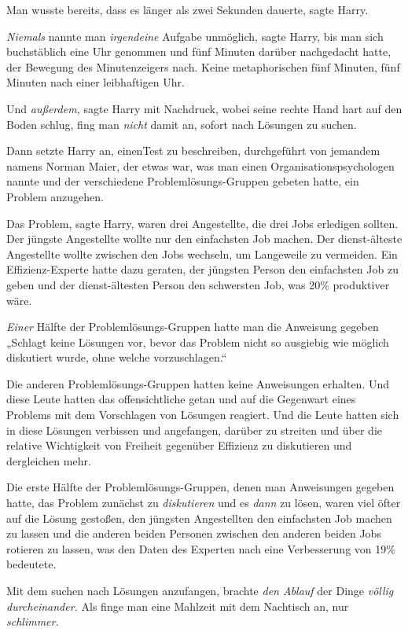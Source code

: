 {Man wusste bereits, dass es länger als zwei Sekunden dauerte, sagte Harry.

\emph{Niemals} nannte man \emph{irgendeine} Aufgabe unmöglich, sagte Harry, bis man sich buchstäblich eine Uhr genommen und fünf Minuten darüber nachgedacht hatte, der Bewegung des Minutenzeigers nach. Keine metaphorischen fünf Minuten, fünf Minuten nach einer leibhaftigen Uhr.

Und \emph{außerdem,} sagte Harry mit Nachdruck, wobei seine rechte Hand hart auf den Boden schlug, fing man \emph{nicht} damit an, sofort nach Lösungen zu suchen.

Dann setzte Harry an, einenTest zu beschreiben, durchgeführt von jemandem namens Norman Maier, der etwas war, was man einen Organisationspsychologen nannte und der verschiedene Problemlösungs-Gruppen gebeten hatte, ein Problem anzugehen.

Das Problem, sagte Harry, waren drei Angestellte, die drei Jobs erledigen sollten. Der jüngste Angestellte wollte nur den einfachsten Job machen. Der dienst-älteste Angestellte wollte zwischen den Jobs wechseln, um Langeweile zu vermeiden. Ein Effizienz-Experte hatte dazu geraten, der jüngsten Person den einfachsten Job zu geben und der dienst-ältesten Person den schwersten Job, was 20\% produktiver wäre.

\emph{Einer} Hälfte der Problemlösungs-Gruppen hatte man die Anweisung gegeben „Schlagt keine Lösungen vor, bevor das Problem nicht so ausgiebig wie möglich diskutiert wurde, ohne welche vorzuschlagen.“

Die anderen Problemlösungs-Gruppen hatten keine Anweisungen erhalten. Und diese Leute hatten das offensichtliche getan und auf die Gegenwart eines Problems mit dem Vorschlagen von Lösungen reagiert. Und die Leute hatten sich in diese Lösungen verbissen und angefangen, darüber zu streiten und über die relative Wichtigkeit von Freiheit gegenüber Effizienz zu diskutieren und dergleichen mehr.

Die erste Hälfte der Problemlösungs-Gruppen, denen man Anweisungen gegeben hatte, das Problem zunächst zu \emph{diskutieren} und es \emph{dann} zu lösen, waren viel öfter auf die Lösung gestoßen, den jüngsten Angestellten den einfachsten Job machen zu lassen und die anderen beiden Personen zwischen den anderen beiden Jobs rotieren zu lassen, was den Daten des Experten nach eine Verbesserung von 19\% bedeutete.

Mit dem suchen nach Lösungen anzufangen, brachte \emph{den Ablauf} der Dinge \emph{völlig durcheinander.} Als finge man eine Mahlzeit mit dem Nachtisch an, nur \emph{schlimmer.}

}
